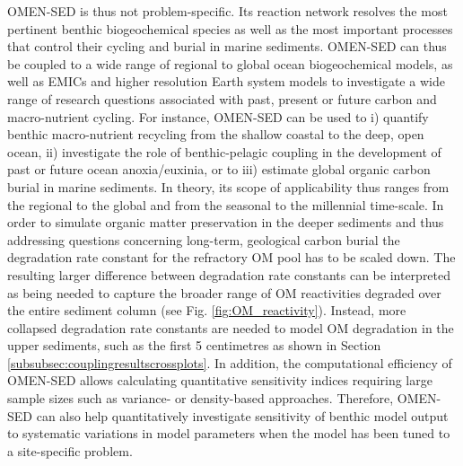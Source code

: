 \documentclass[gmd, manuscript]{copernicus}
\begin{document}
OMEN-SED is thus not problem-specific. Its reaction network resolves the most pertinent benthic biogeochemical species as well as the most important processes that control their cycling and burial in marine sediments. OMEN-SED can thus be 
coupled to a wide range of regional to global ocean biogeochemical models, as well as EMICs and higher resolution Earth system models to investigate a wide range of research questions associated with past, present or future carbon 
and macro-nutrient cycling. For instance, OMEN-SED can be used to i) quantify benthic macro-nutrient recycling from the shallow coastal to the deep, open ocean, ii) investigate the role of benthic-pelagic coupling in the development of past 
or future ocean anoxia/euxinia, or to iii) estimate global organic carbon burial in marine sediments. In theory, its scope of applicability thus ranges from the regional to the global and from the seasonal to the millennial time-scale. 
In order to simulate organic matter preservation in the deeper sediments and thus addressing questions concerning long-term, geological carbon burial the degradation rate constant for the refractory OM pool has to be scaled down. 
The resulting larger difference between degradation rate constants can be interpreted as being needed to capture the broader range of OM reactivities degraded over the entire sediment column (see Fig. \ref{fig:OM_reactivity}). 
Instead, more collapsed degradation rate constants are needed to model OM degradation in the upper sediments, such as the first 5 centimetres as shown in Section \ref{subsubsec:couplingresultscrossplots}.
In addition, the computational efficiency of OMEN-SED allows calculating quantitative sensitivity indices requiring large sample sizes such as variance- or density-based approaches. Therefore, OMEN-SED can also help quantitatively 
investigate sensitivity of benthic model output to systematic variations in model parameters when the model has been tuned to a site-specific problem. 
\end{document}
